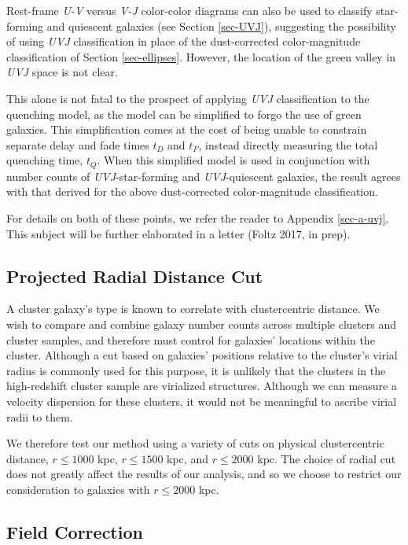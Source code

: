 Rest-frame \textit{U-V} versus \textit{V-J} color-color diagrams can also be used to classify star-forming and quiescent galaxies (see Section \ref{sec-UVJ}), suggesting the possibility of using \textit{UVJ} classification in place of the dust-corrected color-magnitude classification of Section \ref{sec-ellipses}.
However, the location of the green valley in \textit{UVJ} space is not clear.

This alone is not fatal to the prospect of applying \textit{UVJ} classification to the quenching model, as the model can be simplified to forgo the use of green galaxies.
This simplification comes at the cost of being unable to constrain separate delay and fade times $t_D$ and $t_F$, instead directly measuring the total quenching time, $t_Q$.
When this simplified model is used in conjunction with number counts of \textit{UVJ}-star-forming and \textit{UVJ}-quiescent galaxies, the result agrees with that derived for the above dust-corrected color-magnitude classification.

For details on both of these points, we refer the reader to Appendix \ref{sec-a-uvj}.
This subject will be further elaborated in a letter (Foltz 2017, in prep).

\subsection{Projected Radial Distance Cut}\label{sec-r}

A cluster galaxy's type is known to correlate with clustercentric distance.
We wish to compare and combine galaxy number counts across multiple clusters and cluster samples, and therefore must control for galaxies' locations within the cluster.
Although a cut based on galaxies' positions relative to the cluster's virial radius is commonly used for this purpose, it is unlikely that the clusters in the high-redshift cluster sample are virialized structures.
Although we can measure a velocity dispersion for these clusters, it would not be meaningful to ascribe virial radii to them.

We therefore test our method using a variety of cuts on physical clustercentric distance, $r \leq 1000$ kpc, $r \leq 1500$ kpc, and $r \leq 2000$ kpc.
The choice of radial cut does not greatly affect the results of our analysis, and so we choose to restrict our consideration to galaxies with $r \leq 2000$ kpc.

\subsection{Field Correction}\label{sec-bkg}

